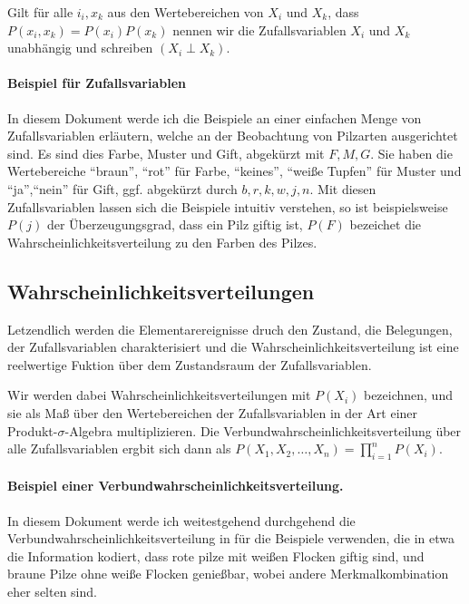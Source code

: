 \documentclass{llncs}
\begin{document}
Gilt für alle $i_i, x_k$ aus den Wertebereichen von $X_i$ und $X_k$, dass $P(x_i,x_k) = P(x_i) P(x_k)$ nennen wir die Zufallsvariablen $X_i$ und $X_k$ unabhängig und schreiben $(X_i \perp X_k)$. 

\paragraph{Beispiel für Zufallsvariablen} In diesem Dokument werde ich die Beispiele an einer einfachen Menge von Zufallsvariablen erläutern, welche an der Beobachtung von Pilzarten ausgerichtet sind. Es sind dies Farbe, Muster und Gift, abgekürzt mit $F,M,G$. Sie haben die Wertebereiche ``braun'', ``rot'' für Farbe, ``keines'', ``weiße Tupfen'' für Muster und ``ja'',``nein'' für Gift, ggf. abgekürzt durch $b,r,k,w,j,n$. Mit diesen Zufallsvariablen lassen sich die Beispiele intuitiv verstehen, so ist beispielsweise $P(j)$ der Überzeugungsgrad, dass ein Pilz giftig ist, $P(F)$ bezeichet die Wahrscheinlichkeitsverteilung zu den Farben des Pilzes. 

\subsection{Wahrscheinlichkeitsverteilungen}

Letzendlich werden die Elementarereignisse druch den Zustand, die Belegungen, der Zufallsvariablen charakterisiert und die Wahrscheinlichkeitsverteilung ist eine reelwertige Fuktion über dem Zustandsraum der Zufallsvariablen. 

Wir werden dabei Wahrscheinlichkeitsverteilungen mit $P(X_i)$ bezeichnen, und sie als Maß über den Wertebereichen der Zufallsvariablen in der Art einer Produkt-$\sigma$-Algebra multiplizieren. Die Verbundwahrscheinlichkeitsverteilung über alle Zufallsvariablen ergbit sich dann als $ P(X_1,X_2,\dots,X_n) = \prod_{i=1}^n P(X_i) $. 

\paragraph{Beispiel einer Verbundwahrscheinlichkeitsverteilung. } 

In diesem Dokument werde ich weitestgehend durchgehend die Verbundwahrscheinlichkeitsverteilung in  für die Beispiele verwenden, die in etwa die Information kodiert, dass rote pilze mit weißen Flocken giftig sind, und braune Pilze ohne weiße Flocken genießbar, wobei andere Merkmalkombination eher selten sind. 
\end{document}

